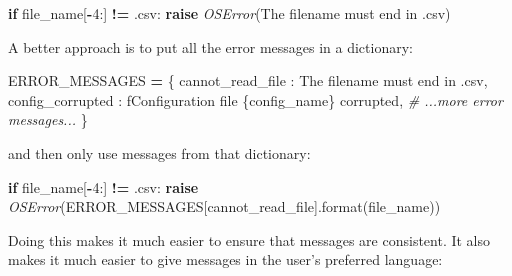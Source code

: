 \documentclass[
]{krantz}
\makeatletter
\newenvironment{Shaded}{\begin{snugshade}}{\end{snugshade}}
\newcommand{\BuiltInTok}[1]{#1}
\newcommand{\CommentTok}[1]{\textcolor[rgb]{0.56,0.35,0.01}{\textit{#1}}}
\newcommand{\ControlFlowTok}[1]{\textcolor[rgb]{0.13,0.29,0.53}{\textbf{#1}}}
\newcommand{\DecValTok}[1]{\textcolor[rgb]{0.00,0.00,0.81}{#1}}
\newcommand{\NormalTok}[1]{#1}
\newcommand{\OperatorTok}[1]{\textcolor[rgb]{0.81,0.36,0.00}{\textbf{#1}}}
\newcommand{\PreprocessorTok}[1]{\textcolor[rgb]{0.56,0.35,0.01}{\textit{#1}}}
\newcommand{\SpecialCharTok}[1]{\textcolor[rgb]{0.00,0.00,0.00}{#1}}
\newcommand{\SpecialStringTok}[1]{\textcolor[rgb]{0.31,0.60,0.02}{#1}}
\newcommand{\StringTok}[1]{\textcolor[rgb]{0.31,0.60,0.02}{#1}}
\newenvironment{kframe}{%
\medskip{}
\setlength{\fboxsep}{.8em}
 \def\at@end@of@kframe{}%
 \ifinner\ifhmode%
  \def\at@end@of@kframe{\end{minipage}}%
  \begin{minipage}{\columnwidth}%
 \fi\fi%
 \def\FrameCommand##1{\hskip\@totalleftmargin \hskip-\fboxsep
 \colorbox{shadecolor}{##1}\hskip-\fboxsep
     \hskip-\linewidth \hskip-\@totalleftmargin \hskip\columnwidth}%
 \MakeFramed {\advance\hsize-\width
   \@totalleftmargin\z@ \linewidth\hsize
   \@setminipage}}%
 {\par\unskip\endMakeFramed%
 \at@end@of@kframe}
\renewenvironment{Shaded}{\begin{kframe}}{\end{kframe}}
\makeatother
\begin{document}
\begin{Shaded}
\begin{Highlighting}[]
\ControlFlowTok{if}\NormalTok{ file\_name[}\OperatorTok{{-}}\DecValTok{4}\NormalTok{:] }\OperatorTok{!=} \StringTok{\textquotesingle{}.csv\textquotesingle{}}\NormalTok{:}
    \ControlFlowTok{raise} \PreprocessorTok{OSError}\NormalTok{(}\StringTok{\textquotesingle{}The filename must end in \textasciigrave{}.csv\textasciigrave{}\textquotesingle{}}\NormalTok{)}
\end{Highlighting}
\end{Shaded}

A better approach is to put all the error messages in a dictionary:

\begin{Shaded}
\begin{Highlighting}[]
\NormalTok{ERROR\_MESSAGES }\OperatorTok{=}\NormalTok{ \{}
    \StringTok{\textquotesingle{}cannot\_read\_file\textquotesingle{}}\NormalTok{ : }\StringTok{\textquotesingle{}The filename must end in \textasciigrave{}.csv\textasciigrave{}\textquotesingle{}}\NormalTok{,}
    \StringTok{\textquotesingle{}config\_corrupted\textquotesingle{}}\NormalTok{ : }\SpecialStringTok{f\textquotesingle{}Configuration file }\SpecialCharTok{\{}\NormalTok{config\_name}\SpecialCharTok{\}}\SpecialStringTok{ corrupted\textquotesingle{}}\NormalTok{,}
    \CommentTok{\# ...more error messages...}
\NormalTok{\}}
\end{Highlighting}
\end{Shaded}

and then only use messages from that dictionary:

\begin{Shaded}
\begin{Highlighting}[]
\ControlFlowTok{if}\NormalTok{ file\_name[}\OperatorTok{{-}}\DecValTok{4}\NormalTok{:] }\OperatorTok{!=} \StringTok{\textquotesingle{}.csv\textquotesingle{}}\NormalTok{:}
    \ControlFlowTok{raise} \PreprocessorTok{OSError}\NormalTok{(ERROR\_MESSAGES[}\StringTok{\textquotesingle{}cannot\_read\_file\textquotesingle{}}\NormalTok{].}\BuiltInTok{format}\NormalTok{(file\_name))}
\end{Highlighting}
\end{Shaded}

Doing this makes it much easier to ensure that messages are consistent.
It also makes it much easier to give messages in the user's preferred language:
\end{document}
